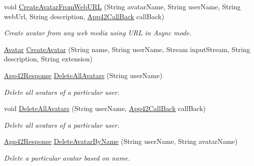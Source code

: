 \begin{DoxyCompactItemize}
void \hyperlink{classcom_1_1shephertz_1_1app42_1_1paas_1_1sdk_1_1csharp_1_1avatar_1_1_avatar_service_ae5f18e2cc50a7d88efefee5b0bd54b64}{Create\+Avatar\+From\+Web\+U\+R\+L} (String avatar\+Name, String user\+Name, String web\+Url, String description, \hyperlink{interfacecom_1_1shephertz_1_1app42_1_1paas_1_1sdk_1_1csharp_1_1_app42_call_back}{App42\+Call\+Back} call\+Back)
\begin{DoxyCompactList}\small\item\em Create avatar from any web media using U\+R\+L in Async mode. \end{DoxyCompactList}\item 
\hyperlink{classcom_1_1shephertz_1_1app42_1_1paas_1_1sdk_1_1csharp_1_1avatar_1_1_avatar}{Avatar} \hyperlink{classcom_1_1shephertz_1_1app42_1_1paas_1_1sdk_1_1csharp_1_1avatar_1_1_avatar_service_adeac2070c485b9b1e0bc16d28ca396b1}{Create\+Avatar} (String name, String user\+Name, Stream input\+Stream, String description, String extension)
\item 
\hyperlink{classcom_1_1shephertz_1_1app42_1_1paas_1_1sdk_1_1csharp_1_1_app42_response}{App42\+Response} \hyperlink{classcom_1_1shephertz_1_1app42_1_1paas_1_1sdk_1_1csharp_1_1avatar_1_1_avatar_service_ac8b11d1c4b5228a20dbfe7fac37782c4}{Delete\+All\+Avatars} (String user\+Name)
\begin{DoxyCompactList}\small\item\em Delete all avatars of a particular user. \end{DoxyCompactList}\item 
void \hyperlink{classcom_1_1shephertz_1_1app42_1_1paas_1_1sdk_1_1csharp_1_1avatar_1_1_avatar_service_ada5b57bc54cc6a3be19529b5f6d049d5}{Delete\+All\+Avatars} (String user\+Name, \hyperlink{interfacecom_1_1shephertz_1_1app42_1_1paas_1_1sdk_1_1csharp_1_1_app42_call_back}{App42\+Call\+Back} call\+Back)
\begin{DoxyCompactList}\small\item\em Delete all avatars of a particular user. \end{DoxyCompactList}\item 
\hyperlink{classcom_1_1shephertz_1_1app42_1_1paas_1_1sdk_1_1csharp_1_1_app42_response}{App42\+Response} \hyperlink{classcom_1_1shephertz_1_1app42_1_1paas_1_1sdk_1_1csharp_1_1avatar_1_1_avatar_service_a6e44214f64e2fd2ec02eb3b37b5c2afc}{Delete\+Avatar\+By\+Name} (String user\+Name, String avatar\+Name)
\begin{DoxyCompactList}\small\item\em Delete a particular avatar based on name. \end{DoxyCompactList}\item 

\end{DoxyCompactItemize}
